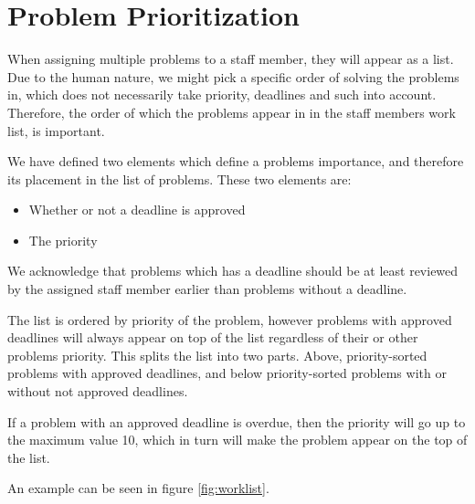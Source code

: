\section{Problem Prioritization}
\label{sec:problem_priority}

When assigning multiple problems to a staff member, they will appear as a list. 
Due to the human nature, we might pick a specific order of solving the problems in, which does not necessarily take priority, deadlines and such into account. 
Therefore, the order of which the problems appear in in the staff members work list, is important.

We have defined two elements which define a problems importance, and therefore its placement in the list of problems. 
These two elements are:

\begin{itemize}
	\item Whether or not a deadline is approved
	\item The priority
\end{itemize}

We acknowledge that problems which has a deadline should be at least reviewed by the assigned staff member earlier than problems without a deadline.

The list is ordered by priority of the problem, however problems with approved deadlines will always appear on top of the list regardless of their or other problems priority. 
This splits the list into two parts. Above, priority-sorted problems with approved deadlines, and below priority-sorted problems with or without not approved deadlines. 

If a problem with an approved deadline is overdue, then the priority will go up to the maximum value 10, which in turn will make the problem appear on the top of the list.

An example can be seen in figure \ref{fig:worklist}.